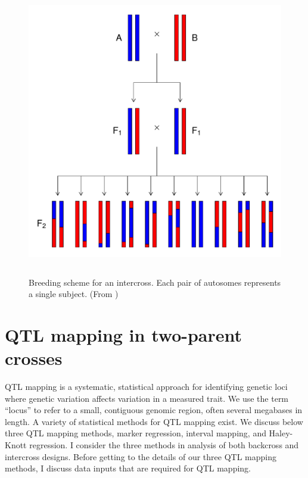 \documentclass[oneside]{book}\usepackage[]{graphicx}\usepackage[]{color}
\makeatletter
\def\maxwidth{ %
  \ifdim\Gin@nat@width>\linewidth
    \linewidth
  \else
    \Gin@nat@width
  \fi
}
\newenvironment{knitrout}{}{} %
\def\maxwidth{\ifdim\Gin@nat@width>\linewidth\linewidth\else\Gin@nat@width\fi}
\makeatother
\begin{document}
\begin{knitrout}
\color{fgcolor}\begin{figure}
\includegraphics[width=\maxwidth,height=5in]{figure/intercross-1} \caption[Breeding scheme for an intercross]{Breeding scheme for an intercross. Each pair of autosomes represents a single subject. (From \citet{broman2009guide})}\label{fig:intercross}
\end{figure}


\end{knitrout}


\section{QTL mapping in two-parent crosses}\label{sec:qtl-two-parent}

QTL mapping is a systematic, statistical approach for identifying genetic
loci where genetic variation affects variation in a measured trait.
We use the term ``locus'' to refer to a small, contiguous genomic region, often
several megabases in length. A variety of statistical methods for QTL mapping
exist. We discuss below three QTL mapping methods,
marker regression, interval mapping, and Haley-Knott regression. I consider
the three methods in analysis of both backcross and intercross designs.
Before getting to the details of our three QTL mapping methods, I discuss
data inputs that are required for QTL mapping. 
\end{document}
